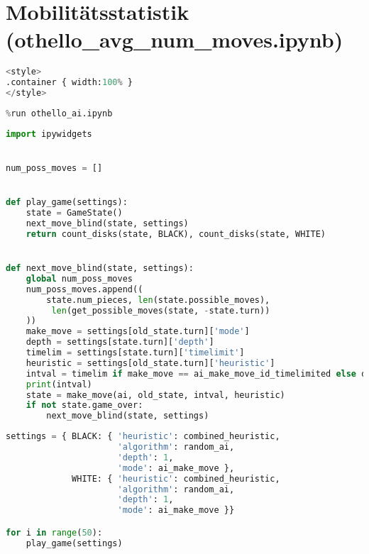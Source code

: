 \hypertarget{mobilituxe4tsstatistik-othello_avg_num_moves.ipynb}{%
\section{Mobilitätsstatistik
(othello\_avg\_num\_moves.ipynb)}\label{mobilituxe4tsstatistik-othello_avg_num_moves.ipynb}}

\label{sec:mobilitystats}

\begin{lstlisting}[language=Python]
%%HTML
<style>
.container { width:100% }
</style>
\end{lstlisting}

\begin{lstlisting}[language=Python]
%run othello_game.ipynb
%run othello_ai.ipynb
\end{lstlisting}

\begin{lstlisting}[language=Python]
import ipywidgets


num_poss_moves = []


def play_game(settings):
    state = GameState()
    next_move_blind(state, settings)
    return count_disks(state, BLACK), count_disks(state, WHITE)


def next_move_blind(state, settings):
    global num_poss_moves
    num_poss_moves.append((
        state.num_pieces, len(state.possible_moves),
         len(get_possible_moves(state, -state.turn))
    ))
    make_move = settings[old_state.turn]['mode']
    depth = settings[state.turn]['depth']
    timelim = settings[state.turn]['timelimit']
    heuristic = settings[old_state.turn]['heuristic']
    intval = timelim if make_move == ai_make_move_id_timelimited else depth
    print(intval)
    state = make_move(ai, old_state, intval, heuristic)
    if not state.game_over:
        next_move_blind(state, settings)
\end{lstlisting}

\begin{lstlisting}[language=Python]
settings = { BLACK: { 'heuristic': combined_heuristic,
                      'algorithm': random_ai,
                      'depth': 1,
                      'mode': ai_make_move },
             WHITE: { 'heuristic': combined_heuristic,
                      'algorithm': random_ai,
                      'depth': 1,
                      'mode': ai_make_move }}

for i in range(50):
    play_game(settings)
\end{lstlisting}

